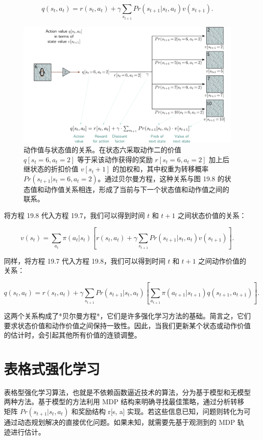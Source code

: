 \begin{equation}
q(s_t, a_t) = r(s_t, a_t) + \gamma \sum_{s_{t+1}} Pr(s_{t+1}|s_t, a_t)v(s_{t+1}). 
\end{equation}

\begin{figure}[ht!]
\centering
\includegraphics[width=0.7\linewidth]{png/chapter19/ReinforceBellman2.png}
\caption{动作值与状态值的关系。在状态六采取动作二的价值 \(q[s_t = 6, a_t = 2]\) 等于采该动作获得的奖励 \(r[s_t = 6, a_t = 2]\) 加上后继状态的折扣价值 \(v[s_t+1]\) 的加权和，其中权重为转移概率 \(Pr(s_{t+1}|s_t = 6, a_t = 2)\)。通过贝尔曼方程，这种关系与图 19.8 的状态值和动作值关系相连，形成了当前与下一个状态值和动作值之间的联系。}
\end{figure}

将方程 19.8 代入方程 19.7，我们可以得到时间 \(t\) 和 \(t + 1\) 之间状态价值的关系：

\begin{equation}
v(s_t) = \sum_{a_t} \pi(a_t|s_t) \left[ r(s_t, a_t) + \gamma \sum_{s_{t+1}} Pr(s_{t+1}|s_t, a_t)v(s_{t+1}) \right].  
\end{equation}

同样，将方程 19.7 代入方程 19.8，我们可以得到时间 \(t\) 和 \(t + 1\) 之间动作价值的关系：

\begin{equation}
q(s_t, a_t) = r(s_t, a_t) + \gamma \sum_{s_{t+1}} Pr(s_{t+1}|s_t, a_t) \left[ \sum_{a_{t+1}} \pi(a_{t+1}|s_{t+1})q(s_{t+1}, a_{t+1}) \right].  
\end{equation}

这两个关系构成了*贝尔曼方程*，它们是许多强化学习方法的基础。简言之，它们要求状态价值和动作价值之间保持一致性。因此，当我们更新某个状态或动作价值的估计时，会引起其他所有价值的连锁调整。

\section{表格式强化学习}
表格型强化学习算法，也就是不依赖函数逼近技术的算法，分为基于模型和无模型两种方法。基于模型的方法利用 MDP 结构来明确寻找最佳策略，通过分析转移矩阵 \(Pr(s_{t+1}|s_t,a_t)\) 和奖励结构 r[s, a] 实现。若这些信息已知，问题则转化为可通过动态规划解决的直接优化问题。如果未知，就需要先基于观测到的 MDP 轨迹进行估计。

